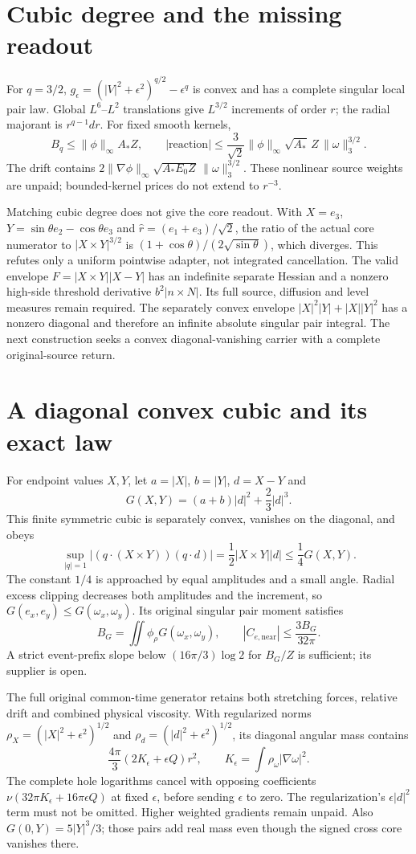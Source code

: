 \documentclass[11pt]{article}
\begin{document}
\section{Cubic degree and the missing readout}
For $q=3/2$, $g_\epsilon=(|V|^2+\epsilon^2)^{q/2}-\epsilon^q$
is convex and has a complete singular local pair law. Global
$L^6$--$L^2$ translations give $L^{3/2}$ increments of order $r$;
the radial majorant is $r^{q-1}dr$. For fixed smooth kernels,
\[
 B_q\le\|\phi\|_\infty A_*Z,\qquad
 |\mathrm{reaction}|\le\frac3{\sqrt2}\|\phi\|_\infty
                  \sqrt{A_*}\,Z\,\|\omega\|_3^{3/2}.
\]
The drift contains $2\|\nabla\phi\|_\infty
\sqrt{A_*E_0Z}\,\|\omega\|_3^{3/2}$. These nonlinear source
weights are unpaid; bounded-kernel prices do not extend to $r^{-3}$.

Matching cubic degree does not give the core readout. With
$X=e_3$, $Y=\sin\theta e_2-\cos\theta e_3$ and
$\widehat r=(e_1+e_3)/\sqrt2$, the ratio of the actual core numerator
to $|X\times Y|^{3/2}$ is
$(1+\cos\theta)/(2\sqrt{\sin\theta})$, which diverges.
This refutes only a uniform pointwise adapter, not integrated cancellation.
The valid envelope $F=|X\times Y||X-Y|$ has an indefinite separate
Hessian and a nonzero high-side threshold derivative
$b^2|n\times N|$. Its full source, diffusion and level measures remain
required. The separately convex envelope
$|X|^2|Y|+|X||Y|^2$ has a nonzero diagonal and therefore an infinite
absolute singular pair integral. The next construction seeks a convex
diagonal-vanishing carrier with a complete original-source return.

\section{A diagonal convex cubic and its exact law}
For endpoint values $X,Y$, let $a=|X|$, $b=|Y|$, $d=X-Y$ and
\[
 G(X,Y)=(a+b)|d|^2+\frac23|d|^3.
\]
This finite symmetric cubic is separately convex, vanishes on the
diagonal, and obeys
\[
 \sup_{|q|=1}|(q\cdot(X\times Y))(q\cdot d)|
 =\frac12|X\times Y||d|\le\frac14G(X,Y).
\]
The constant $1/4$ is approached by equal amplitudes and a small angle.
Radial excess clipping decreases both amplitudes and the increment,
so $G(e_x,e_y)\le G(\omega_x,\omega_y)$. Its original singular
pair moment satisfies
\[
 B_G=\iint\phi_\rho G(\omega_x,\omega_y),\qquad
 |C_{e,\mathrm{near}}|\le\frac{3B_G}{32\pi}.
\]
A strict event-prefix slope below $(16\pi/3)\log2$ for $B_G/Z$
is sufficient; its supplier is open.

The full original common-time generator retains both stretching forces,
relative drift and combined physical viscosity. With regularized norms
$\rho_X=(|X|^2+\epsilon^2)^{1/2}$ and
$\rho_d=(|d|^2+\epsilon^2)^{1/2}$, its diagonal angular mass contains
\[
 \frac{4\pi}{3}(2K_\epsilon+\epsilon Q)r^2,
 \qquad K_\epsilon=\int\rho_\omega|\nabla\omega|^2.
\]
The complete hole logarithms cancel with opposing coefficients
$\nu(32\pi K_\epsilon+16\pi\epsilon Q)$ at fixed $\epsilon$,
before sending $\epsilon$ to zero. The regularization's
$\epsilon|d|^2$ term must not be omitted. Higher weighted gradients
remain unpaid. Also $G(0,Y)=5|Y|^3/3$; those pairs add real mass even
though the signed cross core vanishes there.
\end{document}
